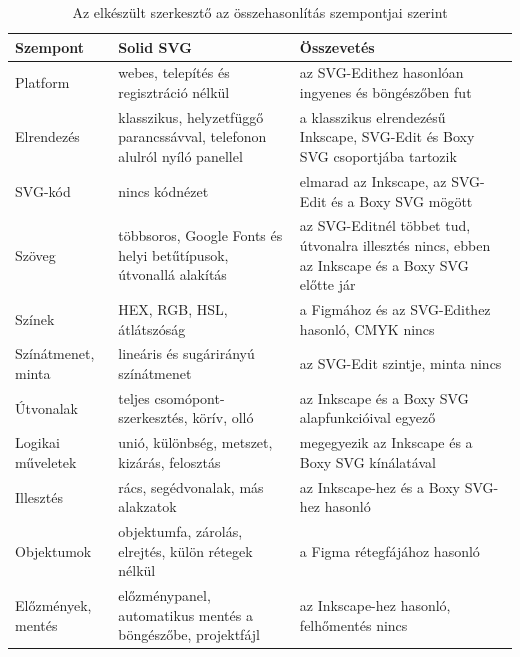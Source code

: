 \begin{table}[!ht]
\caption{Az elkészült szerkesztő az összehasonlítás szempontjai szerint}
\label{tab:own-comparison}
\centering
\footnotesize
\renewcommand{\arraystretch}{1.2}
\begin{tabular}{|>{\raggedright\arraybackslash}p{}|>{\raggedright\arraybackslash}p{}|>{\raggedright\arraybackslash}p{}|}
\hline
\textbf{Szempont} & \textbf{Solid SVG} & \textbf{Összevetés} \\ \hline
Platform & webes, telepítés és regisztráció nélkül & az SVG-Edithez hasonlóan ingyenes és böngészőben fut \\ \hline
Elrendezés & klasszikus, helyzetfüggő parancssávval, telefonon alulról nyíló panellel & a klasszikus elrendezésű Inkscape, SVG-Edit és Boxy SVG csoportjába tartozik \\ \hline
SVG-kód & nincs kódnézet & elmarad az Inkscape, az SVG-Edit és a Boxy SVG mögött \\ \hline
Szöveg & többsoros, Google Fonts és helyi betűtípusok, útvonallá alakítás & az SVG-Editnél többet tud, útvonalra illesztés nincs, ebben az Inkscape és a Boxy SVG előtte jár \\ \hline
Színek & HEX, RGB, HSL, átlátszóság & a Figmához és az SVG-Edithez hasonló, CMYK nincs \\ \hline
Színátmenet, minta & lineáris és sugárirányú színátmenet & az SVG-Edit szintje, minta nincs \\ \hline
Útvonalak & teljes csomópont-szerkesztés, körív, olló & az Inkscape és a Boxy SVG alapfunkcióival egyező \\ \hline
Logikai műveletek & unió, különbség, metszet, kizárás, felosztás & megegyezik az Inkscape és a Boxy SVG kínálatával \\ \hline
Illesztés & rács, segédvonalak, más alakzatok & az Inkscape-hez és a Boxy SVG-hez hasonló \\ \hline
Objektumok & objektumfa, zárolás, elrejtés, külön rétegek nélkül & a Figma rétegfájához hasonló \\ \hline
Előzmények, mentés & előzménypanel, automatikus mentés a böngészőbe, projektfájl & az Inkscape-hez hasonló, felhőmentés nincs \\ \hline
\end{tabular}
\end{table}

